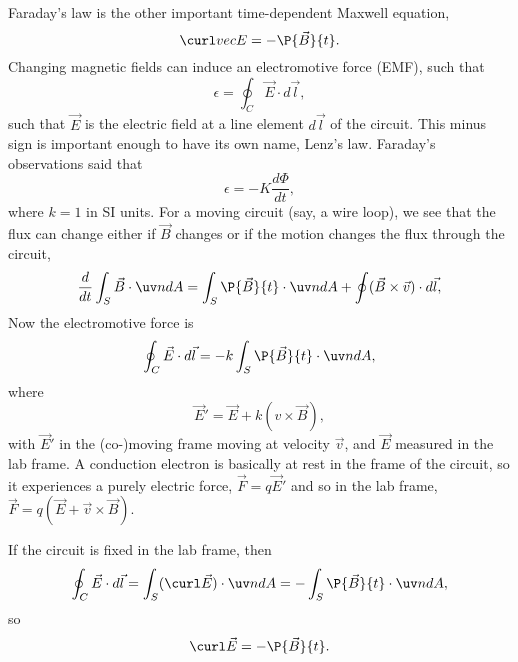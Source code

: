 Faraday's law is the other important time-dependent Maxwell equation,
\begin{equation}
    \curl vec E = -\P{\vec B}{t}.
\end{equation}
Changing magnetic fields can induce an electromotive force (EMF), such that
\begin{equation}
    \epsilon = \oint_C \vec E \cdot d \vec l,
\end{equation}
such that $\vec E $ is the electric field at a line element $d\vec l$ of the circuit. This minus sign is important enough to have its own name, Lenz's law. Faraday's observations said that
\begin{equation}
    \epsilon = -K \frac{d\Phi}{dt},
\end{equation}
where $k=1$ in SI units. For a moving circuit (say, a wire loop), we see that the flux can change either if $\vec B$ changes or if the motion changes the flux through the circuit,
\begin{equation}
    \frac{d}{dt}\int_S \vec B \cdot \uv n dA = \int_S \P{\vec B}{t} \cdot \uv n d A + \oint (\vec B \times \vec v) \cdot d \vec l,
\end{equation}
Now the electromotive force is
\begin{equation}
    \oint_C \vec E \cdot d\vec l = -k \int_S \P{\vec B}{t}\cdot \uv n dA,
\end{equation}
where
\begin{equation}
    \vec E' = \vec E + k(v\times \vec B),
\end{equation}
with $\vec E'$ in the (co-)moving frame moving at velocity $\vec v$, and $\vec E$ measured in the lab frame. A conduction electron is basically at rest in the frame of the circuit, so it experiences a purely electric force, $\vec F = q\vec E'$ and so in the lab frame, $\vec F = q(\vec E + \vec v \times \vec B)$.

If the circuit is fixed in the lab frame, then
\begin{equation}
    \oint_C \vec E \cdot d\vec l = \int_S (\curl \vec E) \cdot \uv n dA = -\int_S \P{\vec B}{t} \cdot \uv n dA,
\end{equation}
so
\begin{equation}
    \curl \vec E = -\P{\vec B}{t}.
\end{equation}
